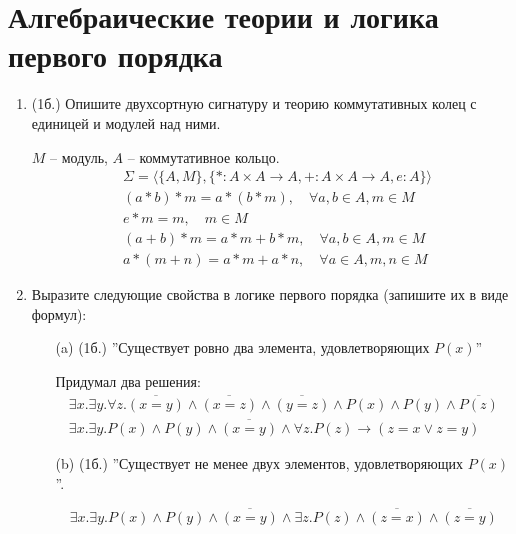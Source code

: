 \section{Алгебраические теории и логика первого порядка}
\begin{enumerate}
    \item (1б.) Опишите двухсортную сигнатуру и теорию коммутативных колец с единицей и модулей над ними.
    \begin{solution}
        $M$ -- модуль, $A$ -- коммутативное кольцо.
        \begin{eqnarray}
            &\Sigma = \langle\{A, M\}, \{*:A \times A \rightarrow A, +:A \times A \rightarrow A, e: A\}\rangle \\
            &(a*b)*m = a*(b*m), \quad \forall a, b \in A, m \in M \\
            &e*m = m, \quad m \in M \\
            &(a+b)*m = a*m+b*m, \quad \forall a, b \in A, m \in M \\
            &a*(m+n) = a*m+a*n, \quad \forall a \in A, m, n \in M
        \end{eqnarray}
    \end{solution}
    \item Выразите следующие свойства в логике первого порядка (запишите их в виде формул):
    \begin{itemize}
        \item[(a)] (1б.) ”Существует ровно два элемента, удовлетворяющих $P(x)$”
        \begin{solution}
            Придумал два решения:
            \begin{eqnarray}
                \exists x. \exists y. \forall z. \overline{(x=y)} \land \overline{(x=z)} \land \overline{(y=z)} \land P(x) \land P(y) \land \overline{P(z)} \\
                \exists x. \exists y. P(x) \land P(y) \land \overline{(x=y)} \land \forall z. P(z) \rightarrow (z = x \lor z = y)
            \end{eqnarray}
        \end{solution}
        \item[(b)] (1б.) ”Существует не менее двух элементов, удовлетворяющих $P(x)$”.
        \begin{solution}
            \begin{equation}
                \exists x. \exists y. P(x) \land P(y) \land \overline{(x=y)} \land \exists z. P(z) \land \overline{(z=x)} \land \overline{(z=y)}
            \end{equation}

\end{solution}
\end{itemize}
\end{enumerate}
